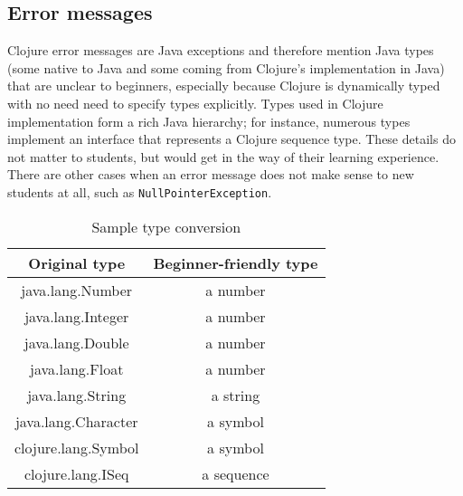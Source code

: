 \documentclass[submission,copyright,creativecommons]{eptcs}
\newcommand{\allcomments}[1]{{#1}}
\newcommand{\elenacomment}[1]{{\bf \textcolor{ForestGreen}{\allcomments{{#1}}}}}
\newcommand{\stephencomment}[1]{{\bf \color{StephensBlue}{\allcomments{{#1}}}}} %
\newcommand{\joecomment}[1]{{\bf \color{JoesGold}{\allcomments{{#1}}}}}
\begin{document}
\subsection{Error messages}\label{subsec:errors}
Clojure error messages are Java exceptions and therefore mention Java types (some native to Java and some coming from Clojure's implementation in Java) that are unclear to beginners, especially because Clojure is dynamically typed with no need need to specify types explicitly. 
Types used in Clojure implementation form a rich Java hierarchy; for instance, numerous types implement an interface that represents a Clojure sequence type. 
These details do not matter to students, but would get in the way of their learning experience. There are other cases when an error message does not make sense to new students at all, such as {\tt NullPointerException}. 

\begin{table}
\centering
\begin{tabular}{|c|c|}
\hline
Original type & Beginner-friendly type \\
\hline
java.lang.Number & a number \\
java.lang.Integer & a number \\
java.lang.Double  & a number \\
java.lang.Float & a number \\
java.lang.String & a string \\
java.lang.Character & a symbol \\
clojure.lang.Symbol  & a symbol \\
clojure.lang.ISeq & a sequence \\
\hline
\end{tabular}
\caption{Sample type conversion}\label{table:types}

\end{table}
\end{document}
